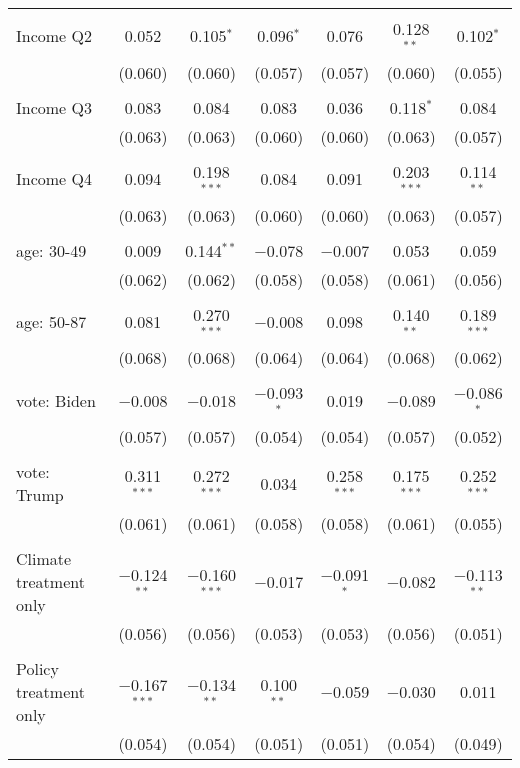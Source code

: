 \begin{tabular}{@{\extracolsep{5pt}}lcccccc}
  & & & & & & \\ 
 Income Q2 & 0.052 & 0.105$^{*}$ & 0.096$^{*}$ & 0.076 & 0.128$^{**}$ & 0.102$^{*}$ \\ 
  & (0.060) & (0.060) & (0.057) & (0.057) & (0.060) & (0.055) \\ 
  & & & & & & \\ 
 Income Q3 & 0.083 & 0.084 & 0.083 & 0.036 & 0.118$^{*}$ & 0.084 \\ 
  & (0.063) & (0.063) & (0.060) & (0.060) & (0.063) & (0.057) \\ 
  & & & & & & \\ 
 Income Q4 & 0.094 & 0.198$^{***}$ & 0.084 & 0.091 & 0.203$^{***}$ & 0.114$^{**}$ \\ 
  & (0.063) & (0.063) & (0.060) & (0.060) & (0.063) & (0.057) \\ 
  & & & & & & \\ 
 age: 30-49 & 0.009 & 0.144$^{**}$ & $-$0.078 & $-$0.007 & 0.053 & 0.059 \\ 
  & (0.062) & (0.062) & (0.058) & (0.058) & (0.061) & (0.056) \\ 
  & & & & & & \\ 
 age: 50-87 & 0.081 & 0.270$^{***}$ & $-$0.008 & 0.098 & 0.140$^{**}$ & 0.189$^{***}$ \\ 
  & (0.068) & (0.068) & (0.064) & (0.064) & (0.068) & (0.062) \\ 
  & & & & & & \\ 
 vote: Biden & $-$0.008 & $-$0.018 & $-$0.093$^{*}$ & 0.019 & $-$0.089 & $-$0.086$^{*}$ \\ 
  & (0.057) & (0.057) & (0.054) & (0.054) & (0.057) & (0.052) \\ 
  & & & & & & \\ 
 vote: Trump & 0.311$^{***}$ & 0.272$^{***}$ & 0.034 & 0.258$^{***}$ & 0.175$^{***}$ & 0.252$^{***}$ \\ 
  & (0.061) & (0.061) & (0.058) & (0.058) & (0.061) & (0.055) \\ 
  & & & & & & \\ 
 Climate treatment only & $-$0.124$^{**}$ & $-$0.160$^{***}$ & $-$0.017 & $-$0.091$^{*}$ & $-$0.082 & $-$0.113$^{**}$ \\ 
  & (0.056) & (0.056) & (0.053) & (0.053) & (0.056) & (0.051) \\ 
  & & & & & & \\ 
 Policy treatment only & $-$0.167$^{***}$ & $-$0.134$^{**}$ & 0.100$^{**}$ & $-$0.059 & $-$0.030 & 0.011 \\ 
  & (0.054) & (0.054) & (0.051) & (0.051) & (0.054) & (0.049) \\ 

\end{tabular}
